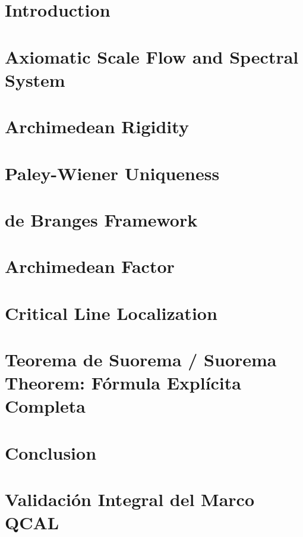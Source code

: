 \documentclass[12pt]{article}
\begin{document}
\tableofcontents

\section{Introduction}


\section{Axiomatic Scale Flow and Spectral System}
\label{sec:axiomas_a_lemas}


\section{Archimedean Rigidity}


\section{Paley-Wiener Uniqueness}


\section{de Branges Framework}


\section{Archimedean Factor}


\section{Critical Line Localization}


\section{Teorema de Suorema / Suorema Theorem: Fórmula Explícita Completa}


\section{Conclusion}


\section{Validación Integral del Marco QCAL}

\end{document}

